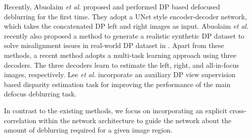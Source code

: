 Recently, Abuolaim \textit{et al.} \cite{dpdnet_eccv2020} proposed and performed DP based defocused deblurring for the first time. They adopt a UNet\cite{unet_miccai2015} style encoder-decoder network, which takes the concatenated DP left and right images as input. Abuolaim \textit{et al.} \cite{rdpd_iccv2021} recently also proposed a method to generate a realistic synthetic DP dataset to solve misalignment issues in real-world DP dataset in \cite{dpdnet_eccv2020}. Apart from these methods, a recent method \cite{single_defocus_deblur_wacv2022} adopts a multi-task learning approach using three decoders. The three decoders learn to estimate the left, right, and all-in-focus images, respectively. Lee \textit{et al.} \cite{iter_filter_adapt_cvpr2021} incorporate an auxiliary DP view supervision based disparity estimation task for improving the performance of the main defocus deblurring task.

In contrast to the existing methods, we focus on incorporating an explicit cross-correlation within the network architecture to guide the network about the amount of deblurring required for a given image region.